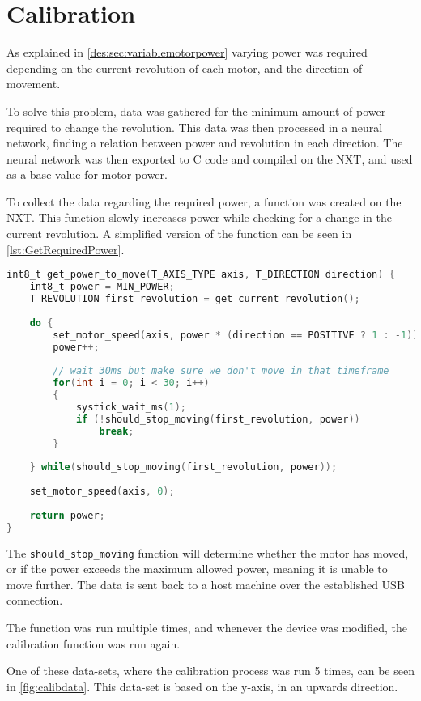 \section{Calibration}\label{sec:calibration}
As explained in \autoref{des:sec:variablemotorpower} varying power was required depending on the current revolution of each motor, and the direction of movement.

To solve this problem, data was gathered for the minimum amount of power required to change the revolution.
This data was then processed in a neural network, finding a relation between power and revolution in each direction.
The neural network was then exported to C code and compiled on the NXT, and used as a base-value for motor power.

To collect the data regarding the required power, a function was created on the NXT.
This function slowly increases power while checking for a change in the current revolution. 
A simplified version of the function can be seen in \autoref{lst:GetRequiredPower}.


\begin{lstlisting}[language=C,label={lst:GetRequiredPower},caption={Getting required power to move }]
int8_t get_power_to_move(T_AXIS_TYPE axis, T_DIRECTION direction) {
	int8_t power = MIN_POWER;
	T_REVOLUTION first_revolution = get_current_revolution();
	
	do {
		set_motor_speed(axis, power * (direction == POSITIVE ? 1 : -1));
		power++;
		
		// wait 30ms but make sure we don't move in that timeframe
		for(int i = 0; i < 30; i++)
		{
			systick_wait_ms(1);
			if (!should_stop_moving(first_revolution, power))
				break;
		}
	
	} while(should_stop_moving(first_revolution, power));
	
	set_motor_speed(axis, 0);
	
	return power;
}

\end{lstlisting}

The \texttt{should\_stop\_moving} function will determine whether the motor has moved, or if the power exceeds the maximum allowed power, meaning it is unable to move further.
The data is sent back to a host machine over the established USB connection.

The function was run multiple times, and whenever the device was modified, the calibration function was run again.

One of these data-sets, where the calibration process was run 5 times, can be seen in \autoref{fig:calibdata}.
This data-set is based on the y-axis, in an upwards direction.


